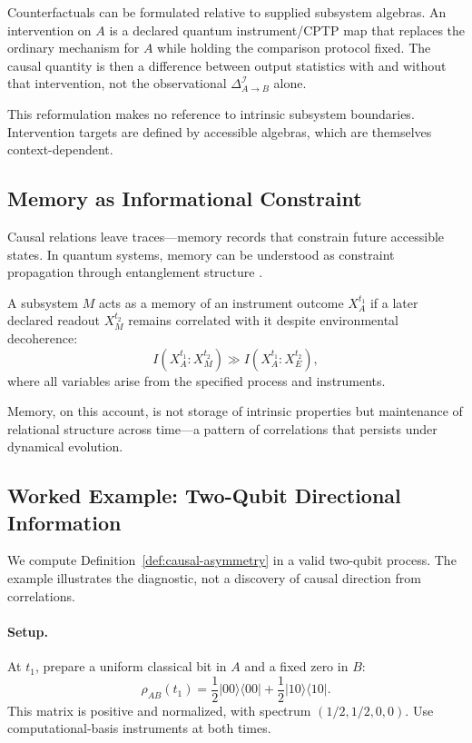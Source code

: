 \documentclass[11pt,a4paper]{article}
\begin{document}
Counterfactuals can be formulated relative to supplied subsystem algebras.  An intervention on $A$ is a declared quantum instrument/CPTP map that replaces the ordinary mechanism for $A$ while holding the comparison protocol fixed.  The causal quantity is then a difference between output statistics with and without that intervention, not the observational $\Delta_{A\to B}^{\mathcal I}$ alone.

This reformulation makes no reference to intrinsic subsystem boundaries. Intervention targets are defined by accessible algebras, which are themselves context-dependent.

\subsection{Memory as Informational Constraint}
\label{sec:I.5}

Causal relations leave traces—memory records that constrain future accessible states. In quantum systems, memory can be understood as constraint propagation through entanglement structure \cite{Hayden2007}.

A subsystem $M$ acts as a memory of an instrument outcome $X_A^{t_1}$ if a later declared readout $X_M^{t_2}$ remains correlated with it despite environmental decoherence:
\begin{equation}
I(X_A^{t_1}:X_M^{t_2})
\gg I(X_A^{t_1}:X_E^{t_2}),
\end{equation}
where all variables arise from the specified process and instruments.

Memory, on this account, is not storage of intrinsic properties but maintenance of relational structure across time—a pattern of correlations that persists under dynamical evolution.

\subsection{Worked Example: Two-Qubit Directional Information}
\label{sec:I.5example}

We compute Definition~\ref{def:causal-asymmetry} in a valid two-qubit process.  The example illustrates the diagnostic, not a discovery of causal direction from correlations.

\paragraph{Setup.}
At $t_1$, prepare a uniform classical bit in $A$ and a fixed zero in $B$:
\begin{equation}
\rho_{AB}(t_1)
=\frac12|00\rangle\langle00|
+\frac12|10\rangle\langle10|.
\end{equation}
This matrix is positive and normalized, with spectrum $(1/2,1/2,0,0)$.  Use computational-basis instruments at both times.
\end{document}
